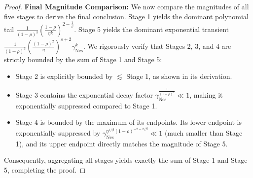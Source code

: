\begin{proof}
\textbf{Final Magnitude Comparison:}
We now compare the magnitudes of all five stages to derive the final conclusion.
Stage 1 yields the dominant polynomial tail $\frac{1}{(1-\rho)^3} \left(\frac{1-\rho}{\eta k}\right)^{2-\frac{1}{\beta}}$.
Stage 5 yields the dominant exponential transient $\frac{1}{(1-\rho)^3} \left(\frac{(1-\rho)^2}{\eta}\right)^{s+2} \gamma_{\mathrm{Nes}}^k$.
We rigorously verify that Stages 2, 3, and 4 are strictly bounded by the sum of Stage 1 and Stage 5:
\begin{itemize}
    \item Stage 2 is explicitly bounded by $\lesssim$ Stage 1, as shown in its derivation.
    \item Stage 3 contains the exponential decay factor $\gamma_{\mathrm{Nes}}^{\frac{1}{(1-\rho)^2}} \ll 1$, making it exponentially suppressed compared to Stage 1.
    \item Stage 4 is bounded by the maximum of its endpoints. Its lower endpoint is exponentially suppressed by $\gamma_{\mathrm{Nes}}^{\eta^{1/\beta}(1-\rho)^{-2-2/\beta}} \ll 1$ (much smaller than Stage 1), and its upper endpoint directly matches the magnitude of Stage 5.
\end{itemize}
Consequently, aggregating all stages yields exactly the sum of Stage 1 and Stage 5, completing the proof.
\end{proof}

